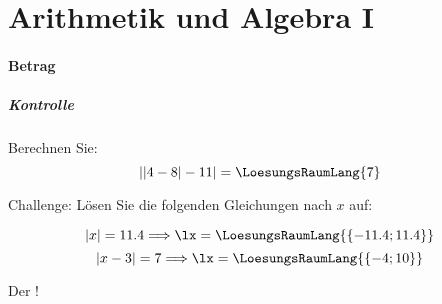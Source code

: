 \part{Arithmetik und Algebra I}
\renewcommand{\bbwPartID}{AA1}

\newpage




\subsection{Betrag}

\subsubsection{Kontrolle}
Berechnen Sie:
$$\left| |4-8| - 11 \right| = \LoesungsRaumLang{7}$$

Challenge: Lösen Sie die folgenden Gleichungen nach $x$ auf:

$$|x| = 11.4 \Longrightarrow \lx = \LoesungsRaumLang{\{-11.4; 11.4\}}$$
$$|x-3| = 7 \Longrightarrow \lx = \LoesungsRaumLang{\{-4; 10\}}$$

Der !
\newpage
%







\newpage
